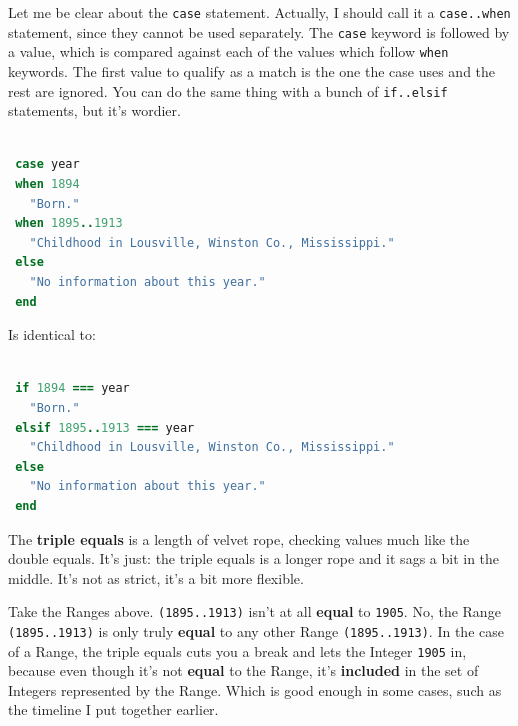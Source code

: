 \documentclass[10pt,twoside]{report}
\begin{document}
Let me be clear about the \lstinline[breaklines=true]|case| statement.
Actually, I should call it a \lstinline[breaklines=true]|case..when|
statement, since they cannot be used separately.  The
\lstinline[breaklines=true]|case| keyword is followed by a value,
which is compared against each of the values which follow
\lstinline[breaklines=true]|when| keywords.  The first value to
qualify as a match is the one the case uses and the rest are ignored.
You can do the same thing with a bunch of
\lstinline[breaklines=true]|if..elsif| statements, but it's wordier.


\begin{lstlisting}[basicstyle=\ttfamily\color{basiccolor},
    commentstyle = \ttfamily\color{commentcolor},
    keywordstyle=\ttfamily\color{keywordscolor},
    stringstyle=\color{stringcolor},
    language=Ruby,
    basicstyle=\small\ttfamily,
    showstringspaces=false,
  ]

 case year
 when 1894
   "Born."
 when 1895..1913
   "Childhood in Lousville, Winston Co., Mississippi."
 else
   "No information about this year."
 end

\end{lstlisting}


Is identical to:


\begin{lstlisting}[basicstyle=\ttfamily\color{basiccolor},
    commentstyle = \ttfamily\color{commentcolor},
    keywordstyle=\ttfamily\color{keywordscolor},
    stringstyle=\color{stringcolor},
    language=Ruby,
    basicstyle=\small\ttfamily,
    showstringspaces=false,
  ]

 if 1894 === year
   "Born."
 elsif 1895..1913 === year
   "Childhood in Lousville, Winston Co., Mississippi."
 else
   "No information about this year."
 end

\end{lstlisting}


The {\bf triple equals} is a length of velvet rope, checking values
much like the double equals.  It's just: the triple equals is a longer
rope and it sags a bit in the middle.  It's not as strict, it's a bit
more flexible.

Take the Ranges above.  \lstinline[breaklines=true]|(1895..1913)|
isn't at all {\bf equal} to \lstinline[breaklines=true]|1905|.  No,
the Range \lstinline[breaklines=true]|(1895..1913)| is only truly {\bf
  equal} to any other Range \lstinline[breaklines=true]|(1895..1913)|.
In the case of a Range, the triple equals cuts you a break and lets
the Integer \lstinline[breaklines=true]|1905| in, because even though
it's not {\bf equal} to the Range, it's {\bf included} in the set of
Integers represented by the Range.  Which is good enough in some
cases, such as the timeline I put together earlier.
\end{document}
